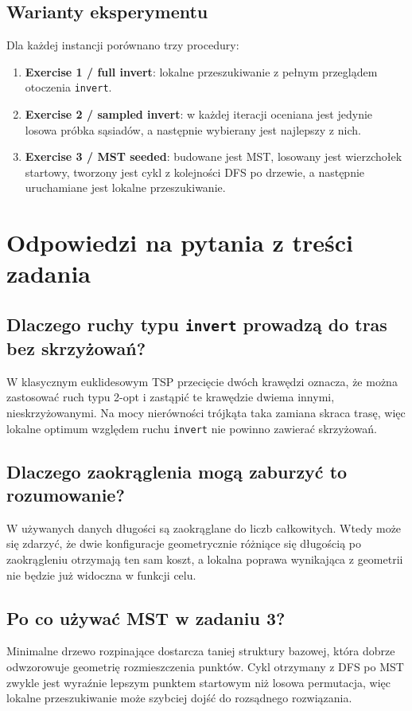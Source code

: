 \documentclass[12pt,a4paper]{article}
\begin{document}
\subsection*{Warianty eksperymentu}
Dla każdej instancji porównano trzy procedury:
\begin{enumerate}
    \item \textbf{Exercise 1 / full invert}: lokalne przeszukiwanie z pełnym przeglądem
    otoczenia \texttt{invert}.
    \item \textbf{Exercise 2 / sampled invert}: w każdej iteracji oceniana jest jedynie losowa
    próbka sąsiadów, a następnie wybierany jest najlepszy z nich.
    \item \textbf{Exercise 3 / MST seeded}: budowane jest MST, losowany jest wierzchołek startowy,
    tworzony jest cykl z kolejności DFS po drzewie, a następnie uruchamiane jest lokalne
    przeszukiwanie.
\end{enumerate}

\section{Odpowiedzi na pytania z treści zadania}
\subsection*{Dlaczego ruchy typu \texttt{invert} prowadzą do tras bez skrzyżowań?}
W klasycznym euklidesowym TSP przecięcie dwóch krawędzi oznacza, że można zastosować ruch typu
2-opt i zastąpić te krawędzie dwiema innymi, nieskrzyżowanymi. Na mocy nierówności trójkąta taka
zamiana skraca trasę, więc lokalne optimum względem ruchu \texttt{invert} nie powinno zawierać
skrzyżowań.

\subsection*{Dlaczego zaokrąglenia mogą zaburzyć to rozumowanie?}
W używanych danych długości są zaokrąglane do liczb całkowitych. Wtedy może się zdarzyć, że dwie
konfiguracje geometrycznie różniące się długością po zaokrągleniu otrzymają ten sam koszt,
a lokalna poprawa wynikająca z geometrii nie będzie już widoczna w funkcji celu.

\subsection*{Po co używać MST w zadaniu 3?}
Minimalne drzewo rozpinające dostarcza taniej struktury bazowej, która dobrze odwzorowuje
geometrię rozmieszczenia punktów. Cykl otrzymany z DFS po MST zwykle jest wyraźnie lepszym
punktem startowym niż losowa permutacja, więc lokalne przeszukiwanie może szybciej dojść
do rozsądnego rozwiązania.
\end{document}
